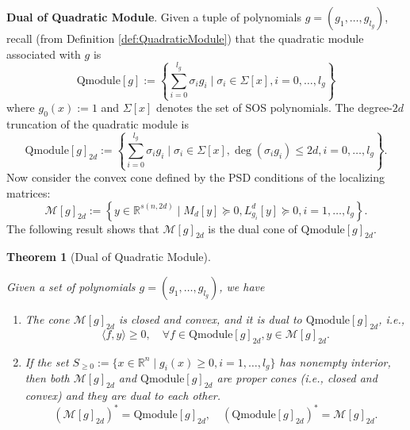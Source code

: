 \documentclass[
]{book}
\newtheorem{theorem}{Theorem}[chapter]
\theoremstyle{definition}
\theoremstyle{definition}
\theoremstyle{definition}
\theoremstyle{definition}
\theoremstyle{remark}
\begin{document}
\textbf{Dual of Quadratic Module}. Given a tuple of polynomials \(g = (g_1,\dots,g_{l_g})\), recall (from Definition \ref{def:QuadraticModule}) that the quadratic module associated with \(g\) is
\[
\mathrm{Qmodule}[g] :=  \left\{  \sum_{i=0}^{l_g} \sigma_i g_i \mid \sigma_i \in \Sigma[x],i=0,\dots,l_g  \right\} 
\]
where \(g_0(x):=1\) and \(\Sigma[x]\) denotes the set of SOS polynomials. The degree-\(2d\) truncation of the quadratic module is
\begin{equation}
\mathrm{Qmodule}[g]_{2d} :=  \left\{  \sum_{i=0}^{l_g} \sigma_i g_i \mid \sigma_i \in \Sigma[x], \deg(\sigma_i g_i) \leq 2d, i=0,\dots,l_g  \right\} .
\label{eq:quadratic-module-truncated}
\end{equation}
Now consider the convex cone defined by the PSD conditions of the localizing matrices:
\begin{equation}
\mathcal{M}[g]_{2d} :=  \left\{  y \in \mathbb{R}^{s(n,2d)} \mid M_d[y] \succeq 0, L_{g_i}^d[y] \succeq 0, i=1,\dots,l_g \right\} .
\label{eq:tms-cone-dual-qmodule}
\end{equation}
The following result shows that \(\mathcal{M}[g]_{2d}\) is the dual cone of \(\mathrm{Qmodule}[g]_{2d}\).

\begin{theorem}[Dual of Quadratic Module]
\protect\hypertarget{thm:DualQuadratedModule}{}\label{thm:DualQuadratedModule}

Given a set of polynomials \(g=(g_1,\dots,g_{l_g})\), we have

\begin{enumerate}
\def\labelenumi{\arabic{enumi}.}
\item
  The cone \(\mathcal{M}[g]_{2d}\) is closed and convex, and it is dual to \(\mathrm{Qmodule}[g]_{2d}\), i.e.,
  \[
  \langle f, y \rangle \geq 0, \quad \forall f \in \mathrm{Qmodule}[g]_{2d}, y \in \mathcal{M}[g]_{2d}.
  \]
\item
  If the set \(S_{\geq 0} := \{ x \in \mathbb{R}^{n} \mid g_i(x) \geq 0, i=1,\dots,l_g \}\) has nonempty interior, then both \(\mathcal{M}[g]_{2d}\) and \(\mathrm{Qmodule}[g]_{2d}\) are proper cones (i.e., closed and convex) and they are dual to each other.
  \[
  (\mathcal{M}[g]_{2d})^* = \mathrm{Qmodule}[g]_{2d}, \quad (\mathrm{Qmodule}[g]_{2d})^* = \mathcal{M}[g]_{2d}.
  \]
\end{enumerate}

\end{theorem}
\end{document}
